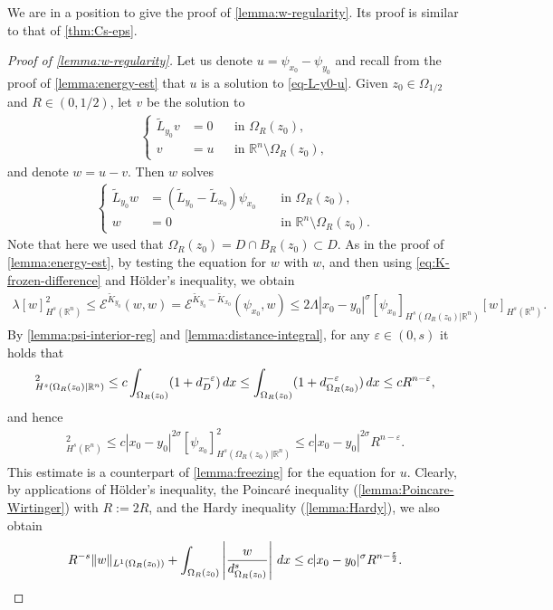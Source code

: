 \documentclass[11pt,reqno]{amsart}
\theoremstyle{plain}
\theoremstyle{definition}
\numberwithin{equation}{section}
\newcommand{\R}{\mathbb{R}}
\newcommand{\cE}{\mathcal{E}}
\newcommand{\eps}{\varepsilon}
\newcommand{\1}{\mathbbm{1}}
\renewcommand{\d}{\textnormal{\,d}}
\begin{document}
We are in a position to give the proof of \autoref{lemma:w-regularity}. Its proof is similar to that of \autoref{thm:Cs-eps}.



\begin{proof}[Proof of \autoref{lemma:w-regularity}]
Let us denote $u = \psi_{x_0} - \psi_{y_0}$ and recall from the proof of \autoref{lemma:energy-est} that $u$ is a solution to \eqref{eq-L-y0-u}. Given $z_0 \in \Omega_{1/2}$ and $R\in (0, 1/2)$, let $v$ be the solution to
\begin{align*}
\left\{
\begin{aligned}
\widetilde{L}_{y_0}v&=0 &&\text{in }\Omega_R(z_0), \\
v&=u &&\text{in } \R^n \setminus \Omega_R(z_0),
\end{aligned}
\right.
\end{align*}
and denote $w=u-v$. Then $w$ solves
\begin{align*}
\left\{
\begin{aligned}
\widetilde{L}_{y_0} w &= (\widetilde{L}_{y_0} - \widetilde{L}_{x_0})\psi_{x_0} &&\text{ in } \Omega_R(z_0),\\
w &= 0 &&\text{ in } \R^n \setminus \Omega_R(z_0).
\end{aligned}
\right.
\end{align*}
Note that here we used that $\Omega_R(z_0) = D \cap B_R(z_0) \subset D$. As in the proof of \autoref{lemma:energy-est}, by testing the equation for $w$ with $w$, and then using \eqref{eq:K-frozen-difference} and H\"older's inequality, we obtain
\begin{align*}
\lambda [w]_{H^s(\R^n)}^2 \le \cE^{\widetilde{K}_{y_0}}(w,w) = \cE^{\widetilde{K}_{y_0}-\widetilde{K}_{x_0}}(\psi_{x_0},w) \le 2\Lambda |x_0 - y_0|^{\sigma} [\psi_{x_0}]_{H^s(\Omega_R(z_0) | \R^n)} [w]_{H^s(\R^n)}.
\end{align*}
By \autoref{lemma:psi-interior-reg} and \autoref{lemma:distance-integral}, for any $\eps \in (0, s)$ it holds that
\begin{align*}
    [\psi_{x_0}]_{H^s(\Omega_R(z_0) | \R^n)}^2 \le c \int_{\Omega_R(z_0)} (1 + d_{D}^{-\eps}) \d x \leq \int_{\Omega_R(z_0)} (1 + d_{\Omega_R(z_0)}^{-\eps}) \d x \le c R^{n-\eps},
\end{align*}
and hence
\begin{align*}
[w]_{H^s(\R^n)}^2 \le c |x_0 - y_0|^{2\sigma} [\psi_{x_0}]_{H^s(\Omega_R(z_0) | \R^n)}^2 \le c |x_0 - y_0|^{2\sigma} R^{n-\eps}.
\end{align*}
This estimate is a counterpart of \autoref{lemma:freezing} for the equation for $u$. Clearly, by applications of H\"older's inequality, the Poincar\'e inequality (\autoref{lemma:Poincare-Wirtinger}) with $R:=2R$, and the Hardy inequality (\autoref{lemma:Hardy}), we also obtain
\begin{align}
\label{eq:w-regularity-help-1}
R^{-s}\|w\|_{L^1(\Omega_R(z_0))} + \int_{\Omega_R(z_0)} \left| \frac{w}{d_{\Omega_R(z_0)}^s} \right| \d x \leq c |x_0 - y_0|^{\sigma} R^{n-\frac{\eps}{2}}.
\end{align}


\end{proof}
\end{document}
